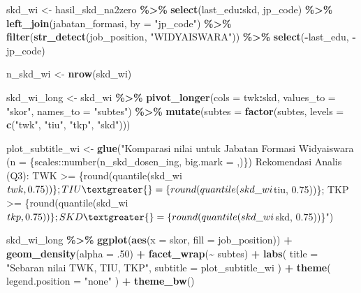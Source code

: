 \documentclass[
]{article}
\newenvironment{Shaded}{\begin{snugshade}}{\end{snugshade}}
\newcommand{\AttributeTok}[1]{\textcolor[rgb]{0.13,0.29,0.53}{#1}}
\newcommand{\DecValTok}[1]{\textcolor[rgb]{0.00,0.00,0.81}{#1}}
\newcommand{\FunctionTok}[1]{\textcolor[rgb]{0.13,0.29,0.53}{\textbf{#1}}}
\newcommand{\NormalTok}[1]{#1}
\newcommand{\OtherTok}[1]{\textcolor[rgb]{0.56,0.35,0.01}{#1}}
\newcommand{\SpecialCharTok}[1]{\textcolor[rgb]{0.81,0.36,0.00}{\textbf{#1}}}
\newcommand{\StringTok}[1]{\textcolor[rgb]{0.31,0.60,0.02}{#1}}
\begin{document}
\begin{Shaded}
\begin{Highlighting}[]
\NormalTok{skd\_wi }\OtherTok{\textless{}{-}}\NormalTok{ hasil\_skd\_na2zero }\SpecialCharTok{\%\textgreater{}\%} 
  \FunctionTok{select}\NormalTok{(last\_edu}\SpecialCharTok{:}\NormalTok{skd, jp\_code) }\SpecialCharTok{\%\textgreater{}\%} 
  \FunctionTok{left\_join}\NormalTok{(jabatan\_formasi, }\AttributeTok{by =} \StringTok{"jp\_code"}\NormalTok{) }\SpecialCharTok{\%\textgreater{}\%} 
  \FunctionTok{filter}\NormalTok{(}\FunctionTok{str\_detect}\NormalTok{(job\_position, }\StringTok{"WIDYAISWARA"}\NormalTok{)) }\SpecialCharTok{\%\textgreater{}\%} 
  \FunctionTok{select}\NormalTok{(}\SpecialCharTok{{-}}\NormalTok{last\_edu, }\SpecialCharTok{{-}}\NormalTok{jp\_code)}


\NormalTok{n\_skd\_wi }\OtherTok{\textless{}{-}} \FunctionTok{nrow}\NormalTok{(skd\_wi)}

\NormalTok{skd\_wi\_long }\OtherTok{\textless{}{-}}\NormalTok{ skd\_wi }\SpecialCharTok{\%\textgreater{}\%}
  \FunctionTok{pivot\_longer}\NormalTok{(}\AttributeTok{cols =}\NormalTok{ twk}\SpecialCharTok{:}\NormalTok{skd,}
               \AttributeTok{values\_to =} \StringTok{"skor"}\NormalTok{,}
               \AttributeTok{names\_to =} \StringTok{"subtes"}\NormalTok{) }\SpecialCharTok{\%\textgreater{}\%} 
  \FunctionTok{mutate}\NormalTok{(}\AttributeTok{subtes =} \FunctionTok{factor}\NormalTok{(subtes, }\AttributeTok{levels =} \FunctionTok{c}\NormalTok{(}\StringTok{"twk"}\NormalTok{, }\StringTok{"tiu"}\NormalTok{, }\StringTok{"tkp"}\NormalTok{, }\StringTok{"skd"}\NormalTok{)))}

\NormalTok{plot\_subtitle\_wi }\OtherTok{\textless{}{-}} \FunctionTok{glue}\NormalTok{(}\StringTok{"Komparasi nilai untuk Jabatan Formasi Widyaiswara (n = \{scales::number(n\_skd\_dosen\_ing, big.mark = \textquotesingle{},\textquotesingle{})\})}
\StringTok{                              Rekomendasi Analis (Q3):}
\StringTok{                              TWK \textgreater{}= \{round(quantile(skd\_wi$twk, 0.75))\}; TIU \textgreater{}= \{round(quantile(skd\_wi$tiu, 0.75))\}; TKP \textgreater{}= \{round(quantile(skd\_wi$tkp, 0.75))\}; SKD \textgreater{}= \{round(quantile(skd\_wi$skd, 0.75))\}"}\NormalTok{)}

\NormalTok{skd\_wi\_long }\SpecialCharTok{\%\textgreater{}\%} 
  \FunctionTok{ggplot}\NormalTok{(}\FunctionTok{aes}\NormalTok{(}\AttributeTok{x =}\NormalTok{ skor, }\AttributeTok{fill =}\NormalTok{ job\_position)) }\SpecialCharTok{+}
  \FunctionTok{geom\_density}\NormalTok{(}\AttributeTok{alpha =}\NormalTok{ .}\DecValTok{50}\NormalTok{) }\SpecialCharTok{+}
  \FunctionTok{facet\_wrap}\NormalTok{(}\SpecialCharTok{\textasciitilde{}}\NormalTok{ subtes) }\SpecialCharTok{+}
  \FunctionTok{labs}\NormalTok{(}
    \AttributeTok{title =} \StringTok{"Sebaran nilai TWK, TIU, TKP"}\NormalTok{,}
    \AttributeTok{subtitle =}\NormalTok{ plot\_subtitle\_wi}
\NormalTok{  ) }\SpecialCharTok{+}
  \FunctionTok{theme}\NormalTok{(}
    \AttributeTok{legend.position =} \StringTok{"none"}
\NormalTok{  ) }\SpecialCharTok{+}
  \FunctionTok{theme\_bw}\NormalTok{()}
\end{Highlighting}
\end{Shaded}
\end{document}
